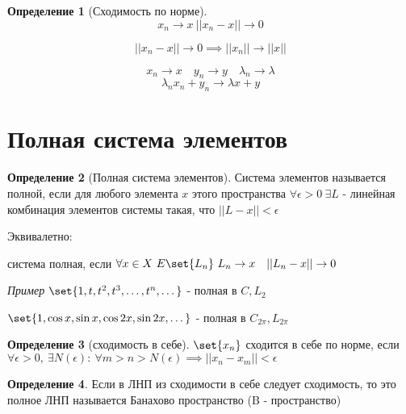 \documentclass[a4paper]{article}
\DeclarePairedDelimiter\set\{\}
\theoremstyle{definition}
\newtheorem*{definition}{Определение}
\theoremstyle{remark}
\begin{document}
\begin{tcolorbox}
    \begin{definition}[Сходимость по норме]
    \[
        x_n \to x \ ||x_n - x|| \to 0
    \]
    \end{definition}
\end{tcolorbox}
\begin{tcolorbox}[title=Непрерывность нормы]
    \[
        ||x_n - x|| \to 0 \implies ||x_n|| \to ||x||
    \]
\end{tcolorbox}
\[
    x_n \to x \quad y_n \to y \quad \lambda_n \to \lambda
\]
\[
    \lambda_n x_n + y_n \to \lambda x + y
\]
\section*{\centering Полная система элементов}
\begin{tcolorbox}
    \begin{definition}[Полная система элементов]
    Система элементов называется полной, если для любого элемента $ x $ этого пространства
    $ \forall \epsilon > 0 \ \exists L $ - линейная комбинация элементов системы такая, что
    $ ||L - x|| < \epsilon$ 

    Эквивалетно:

    система полная, если $ \forall x \in X \ E \set{L_n} \ L_n \to x \quad
    ||L_n - x|| \to 0$ 
    \end{definition}
\end{tcolorbox}

\emph{Пример} $ \set{1, t, t^2, t^3, \dots, t^n, \dots} $ - полная в $ C, L_2 $ 

$ \set{1, \cos x, \sin x, \cos 2x, \sin 2x, \dots} $ - полная в $ C_{2\pi}, L_{2\pi} $ 

\begin{tcolorbox}
    \begin{definition}[сходимость в себе]
        $ \set{x_n} $ сходится в себе по норме, если $ \forall \epsilon > 0, \ 
        \exists N(\epsilon): \ \forall m > n > N(\epsilon) \implies ||x_n - x_m|| < \epsilon$ 
    \end{definition}
\end{tcolorbox}

\begin{tcolorbox}
    \begin{definition}
        Если в ЛНП из сходимости в себе следует сходимость, то это полное ЛНП называется
        Банахово пространство (B - пространство)
    \end{definition}
\end{tcolorbox}
\end{document}

